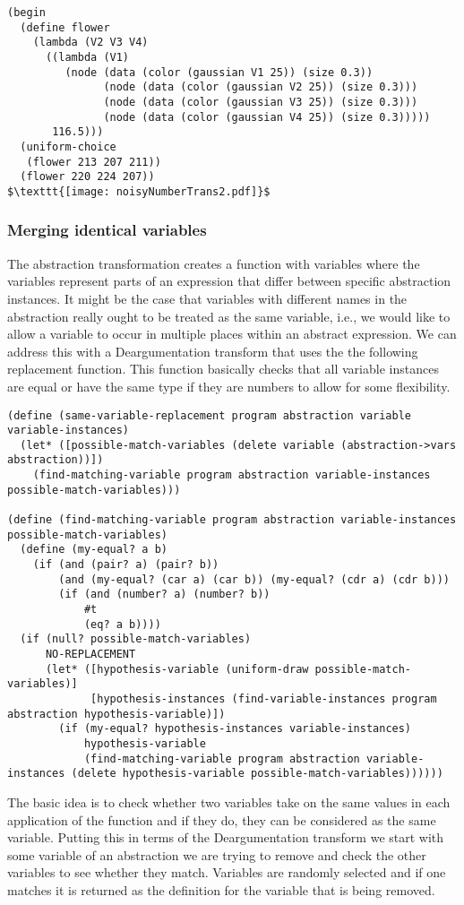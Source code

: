 \documentclass[a4paper,10pt]{article}
\begin{document}
\begin{lstlisting}[mathescape=true]
(begin
  (define flower
    (lambda (V2 V3 V4)
      ((lambda (V1)
         (node (data (color (gaussian V1 25)) (size 0.3))
               (node (data (color (gaussian V2 25)) (size 0.3)))
               (node (data (color (gaussian V3 25)) (size 0.3)))
               (node (data (color (gaussian V4 25)) (size 0.3)))))
       116.5)))
  (uniform-choice
   (flower 213 207 211))
  (flower 220 224 207))
$\texttt{[image: noisyNumberTrans2.pdf]}$
\end{lstlisting}
\subsubsection{Merging identical variables}
The abstraction transformation creates a function with variables where the variables represent parts of an expression that differ between specific abstraction instances.  It might be the case that variables with different names in the abstraction really ought to be treated as the same variable, i.e., we would like to allow a variable to occur in multiple places within an abstract expression.  We can address this with a Deargumentation transform that uses the the following replacement function.  This function basically checks that all variable instances are equal or have the same type if they are numbers to allow for some flexibility.
\begin{lstlisting}[frame=trBL]
(define (same-variable-replacement program abstraction variable variable-instances)
  (let* ([possible-match-variables (delete variable (abstraction->vars abstraction))])
    (find-matching-variable program abstraction variable-instances possible-match-variables)))

(define (find-matching-variable program abstraction variable-instances possible-match-variables)
  (define (my-equal? a b) 
    (if (and (pair? a) (pair? b)) 
        (and (my-equal? (car a) (car b)) (my-equal? (cdr a) (cdr b))) 
        (if (and (number? a) (number? b))
            #t
            (eq? a b)))) 
  (if (null? possible-match-variables)
      NO-REPLACEMENT
      (let* ([hypothesis-variable (uniform-draw possible-match-variables)]
             [hypothesis-instances (find-variable-instances program abstraction hypothesis-variable)])
        (if (my-equal? hypothesis-instances variable-instances)
            hypothesis-variable
            (find-matching-variable program abstraction variable-instances (delete hypothesis-variable possible-match-variables))))))
\end{lstlisting}
The basic idea is to check whether two variables take on the same values in each application of the function and if they do, they can be considered as the same variable.  Putting this in terms of the Deargumentation transform we start with some variable of an abstraction we are trying to remove and check the other variables to see whether they match.  Variables are randomly selected and if one matches it is returned as the definition for the variable that is being removed.  
\end{document}
